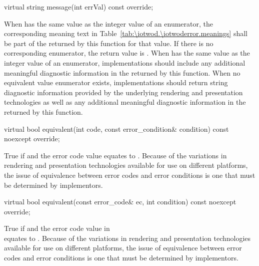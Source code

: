 \begin{itemdecl}
virtual string message(int errVal) const override;
\end{itemdecl}
\begin{itemdescr}
	\pnum
	\returns
	When  has the same value as the integer value of an 
	 enumerator, the corresponding meaning text in 
	Table~\ref{tab:\iotwod.\iotwoderror.meanings} shall be part of the 
	 returned by this function for that value. If there is no 
	corresponding enumerator, the return value is 
	.
	\enternote
	When  has the same value as the integer value of an 
	 enumerator, implementations should include any 
	additional meaningful diagnostic information in the  returned 
	by this function. When no equivalent value enumerator exists, 
	implementations should return string diagnostic information provided by the 
	underlying rendering and presentation technologies as well as any 
	additional meaningful diagnostic information in the  returned 
	by this function.
	\exitnote
	
\end{itemdescr}

\begin{itemdecl}
virtual bool equivalent(int code,
  const error_condition& condition) const noexcept override;
\end{itemdecl}
\begin{itemdescr}
	\pnum
	\returns
	True if  and the  error code value  equates to .
	\enternote
	Because of the variations in rendering and presentation technologies 
	available for use on different platforms, the issue of equivalence between 
	error codes and error conditions is one that must be determined by 
	implementors.
	\exitnote
\end{itemdescr}
\begin{itemdecl}
virtual bool equivalent(const error_code& ec,
  int condition) const noexcept override;
\end{itemdecl}
\begin{itemdescr}
	\pnum
	\returns
	True if  and the  error code value in\\  equates to .
	\enternote
	Because of the variations in rendering and presentation technologies 
	available for use on different platforms, the issue of equivalence between 
	error codes and error conditions is one that must be determined by 
	implementors.
	\exitnote
\end{itemdescr}

